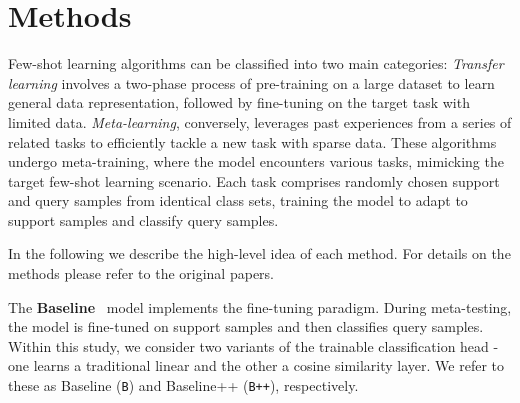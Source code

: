 \section{Methods}


Few-shot learning algorithms can be classified into two main categories: \textit{Transfer learning} involves a two-phase process of pre-training on a large dataset to learn general data representation, 
followed by fine-tuning on the target task with limited data. \textit{Meta-learning}, conversely, leverages past experiences from a series of related tasks to efficiently tackle a new task with sparse data. 
These algorithms undergo meta-training, where the model encounters various tasks, mimicking the target few-shot learning scenario. Each task comprises randomly chosen support and query samples from identical class sets, 
training the model to adapt to support samples and classify query samples.

In the following we describe the high-level idea of each method. For details on the methods please refer to the original papers.

% 
% 
% 


The \textbf{Baseline}~\cite{baseline} model implements the fine-tuning paradigm. During meta-testing, the model is fine-tuned on support samples and then classifies query samples. Within this study, we consider two variants of the trainable classification head - one learns a traditional linear and the other a cosine similarity layer. We refer to these as Baseline (\texttt{B}) and Baseline++ (\texttt{B++}), respectively.

